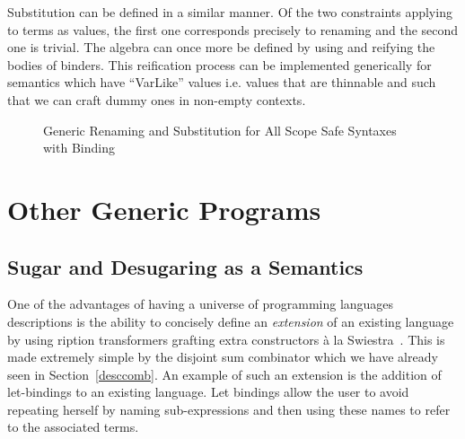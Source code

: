 Substitution can be defined in a similar manner. Of the two
constraints applying to terms as values, the first one corresponds
precisely to renaming and the second one is trivial. The algebra
can once more be defined by using  and reifying the bodies
of binders. This reification process can be implemented generically
for semantics which have ``VarLike'' values i.e. values that are
thinnable and such that we can craft dummy ones in non-empty contexts.

\begin{figure}[h]
\begin{minipage}{0.40\textwidth}
\end{minipage}\hspace{2em}
\begin{minipage}{0.50\textwidth}
\end{minipage}

\begin{minipage}{0.45\textwidth}
\end{minipage}\hspace{2em}
\begin{minipage}{0.45\textwidth}
\end{minipage}
\caption{Generic Renaming and Substitution for All Scope Safe Syntaxes with Binding}
\end{figure}


\section{Other Generic Programs}

\subsection{Sugar and Desugaring as a Semantics}

One of the advantages of having a universe of programming languages
descriptions is the ability to concisely define an \emph{extension}
of an existing language by using ription transformers
grafting extra constructors à la Swiestra~\citeyear{swierstra_2008}.
This is made extremely simple by the
disjoint sum combinator  which we have already seen
in Section~\ref{desccomb}.
An example of such an extension is the addition of let-bindings to
an existing language. Let bindings allow the user to avoid repeating
herself by naming sub-expressions and then using these names to refer
to the associated terms.

